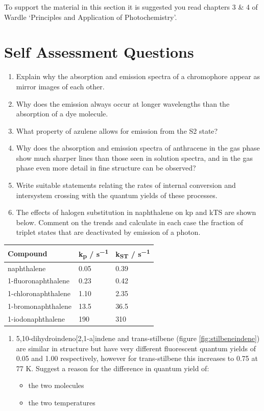 \documentclass[
]{book}
\providecommand{\tightlist}{%
  \setlength{\itemsep}{0pt}\setlength{\parskip}{0pt}}
\begin{document}
To support the material in this section it is suggested you read chapters 3 \& 4 of Wardle `Principles and Application of Photochemistry'.

\hypertarget{sec:SSQemission}{%
\section{Self Assessment Questions}\label{sec:SSQemission}}

\begin{enumerate}
\def\labelenumi{\arabic{enumi}.}
\item
  Explain why the absorption and emission spectra of a chromophore appear as mirror images of each other.
\item
  Why does the emission always occur at longer wavelengths than the absorption of a dye molecule.
\item
  What property of azulene allows for emission from the S2 state?
\item
  Why does the absorption and emission spectra of anthracene in the gas phase show much sharper lines than those seen in solution spectra, and in the gas phase even more detail in fine structure can be observed?
\item
  Write suitable statements relating the rates of internal conversion and intersystem crossing with the quantum yields of these processes.
\item
  The effects of halogen substitution in naphthalene on kp and kTS are shown below. Comment on the trends and calculate in each case the fraction of triplet states that are deactivated by emission of a photon.
\end{enumerate}

\begin{longtable}[]{@{}lll@{}}
\toprule()
Compound & k\textsubscript{p} / s\textsuperscript{−1} & k\textsubscript{ST} / s\textsuperscript{−1} \\
\midrule()
\endhead
naphthalene & 0.05 & 0.39 \\
1-fluoronaphthalene & 0.23 & 0.42 \\
1-chloronaphthalene & 1.10 & 2.35 \\
1-bromonaphthalene & 13.5 & 36.5 \\
1-iodonaphthalene & 190 & 310 \\
\bottomrule()
\end{longtable}

\begin{enumerate}
\def\labelenumi{\arabic{enumi}.}
\setcounter{enumi}{6}
\tightlist
\item
  5,10-dihydroindeno{[}2,1-a{]}indene and trans-stilbene (figure \ref{fig:stilbeneindene}) are similar in structure but have very different fluorescent quantum yields of 0.05 and 1.00 respectively, however for trans-stilbene this increases to 0.75 at 77 K. Suggest a reason for the difference in quantum yield of:

  \begin{itemize}
  \tightlist
  \item
    the two molecules
  \item
    the two temperatures
  \end{itemize}
\end{enumerate}
\end{document}
